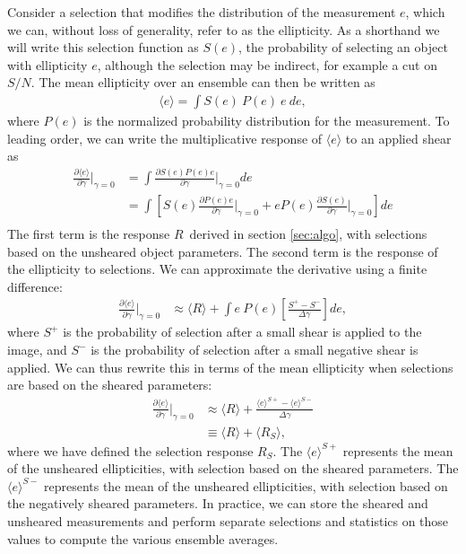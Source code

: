 \documentclass[usegraphicx,usenatbib]{mn2e}
\newcommand{\snr}{$S/N$}
\newcommand{\est}{$e$}
\newcommand{\mest}{e}
\newcommand{\mcalR}{$R$}
\newcommand{\mcalRS}{$R_{S}$}
\begin{document}
Consider a selection that modifies the distribution of the measurement \est,
which we can, without loss of generality, refer to as the ellipticity.  As
a shorthand we will write this selection function as $S(\mest)$, the probability of
selecting an object with ellipticity \est, although the selection may be
indirect, for example a cut on \snr.  The mean ellipticity over an ensemble can
then be written as 
\begin{align}
    \langle \mest \rangle = \int S(\mest)~P(\mest)~\mest~d\mest,
\end{align}
where $P(\mest)$ is the normalized probability
distribution for the measurement.
To leading order, we can write the multiplicative response of $\langle \mest \rangle$ 
to an applied shear as
\begin{align}
    \frac{\partial \langle \mest \rangle}{\partial \gamma}\bigg|_{\gamma=0} 
    &= \int \frac{\partial S(\mest) P(\mest) \mest  }{\partial \gamma}\bigg|_{\gamma=0} d\mest \nonumber \\
    &= \int \left[ S(\mest) \frac{\partial  P(\mest) \mest  }{\partial \gamma}\bigg|_{\gamma=0} + \mest P(\mest) \frac{\partial S(\mest)}{\partial \gamma}\bigg|_{\gamma=0} \right] d\mest \\
\end{align}
The first term is the response \mcalR\ derived in section \ref{sec:algo}, with
selections based on the unsheared object parameters.  The second term is the
response of the ellipticity to selections.  We can approximate the derivative
using a finite difference:
\begin{align}
    \frac{\partial \langle \mest \rangle}{\partial \gamma}\bigg|_{\gamma=0}
    &\approx
    \langle \mbox{\mcalR} \rangle + \int \mest~P(\mest) \left[ \frac{ S^+ - S^- }{\Delta \gamma}\right] d\mest,
\end{align}
where $S^+$ is the probability of selection after a small shear is applied to
the image, and $S^-$ is the probability of selection after a small negative
shear is applied.  We can thus rewrite this in terms of the mean ellipticity
when selections are based on the sheared parameters:
\begin{align}
\frac{\partial \langle \mest \rangle}{\partial \gamma}\bigg|_{\gamma=0} &\approx
    \langle R \rangle + \frac{\langle \mest \rangle^{S+} - \langle \mest \rangle^{S-}}{\Delta \gamma} \nonumber \\
       &\equiv \langle R \rangle + \langle \mbox{\mcalRS} \rangle,
\end{align}
where we have defined the selection response \mcalRS. The $\langle \mest
\rangle^{S+}$ represents the mean of the unsheared ellipticities, with
selection based on the sheared parameters. The $\langle \mest \rangle^{S-}$
represents the mean of the unsheared ellipticities, with selection based on the
negatively sheared parameters.  In practice, we can store the sheared and
unsheared measurements and perform separate selections and statistics on those
values to compute the various ensemble averages.
\end{document}
